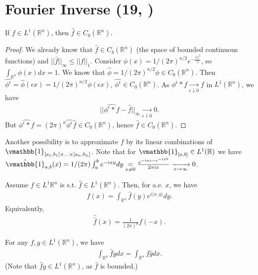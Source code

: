 \section{Fourier Inverse \tiny{(19, \cite{schilling2017measures})}}
\begin{corollary}
    If \(f\in L^1(\mathbb{R}^n)\), then \(\hat{f} \in C_0(\mathbb{R}^n)\).
\end{corollary}
\ifdetailed 
\begin{proof}
    We already know that \(\hat{f}\in C_b(\mathbb{R}^n)\) (the space of bounded continuous functions) and \(||\hat{f}||_{\infty} \leq ||f||_1\). Consider \( \phi(x)=1/(2\pi)^{n/2} e^{-\frac{|x|^2}{2}}\), so \(\int_{\mathbb{R}^n}\phi(x)dx = 1\). We know that \(\hat{\phi}= 1/(2\pi)^{n/2} \phi\in C_0(\mathbb{R}^n)\). Then \(\widehat{\phi^{\epsilon}} = \hat{\phi}(\epsilon x) = 1/(2\pi)^{n/2}\phi(\epsilon x)\), \(\hat{\phi^{\epsilon}} \in C_0(\mathbb{R}^n)\). As \(\phi^{\epsilon}\ast f\xrightarrow[\epsilon\downarrow 0]{ }f\) in \(L^1(\mathbb{R}^n)\), we have 
    \begin{align*}
        ||\widehat{\phi^{\epsilon}\ast f} - \hat{f}||_{\infty} \xrightarrow[\epsilon\downarrow 0]{ } 0.
    \end{align*}
    But \(\widehat{\phi^{\epsilon}\ast f} = (2\pi)^n \widehat{\phi^{\epsilon}}\hat{f}\in C_0(\mathbb{R}^n)\), hence \(\hat{f}\in C_0(\mathbb{R}^n)\).
\end{proof}
\fi 
\begin{remark}
    Another possibility is to approximate \(f\) by its linear combinations of \(\vmathbb{1}_{[a_1, b_1] \times ...\times [a_n, b_n]}\). Note that for \(\vmathbb{1}_{[a,b]}\in L^1(\mathbb{R})\) we have \(\hat{\vmathbb{1}}_{a,b}(x) = 1/(2\pi) \int_{a}^{b}e^{-ixy}dy \underset{x\neq 0}{=} \frac{e^{-iax - e^{-ixb}}}{2\pi ix}\xrightarrow[x\rightarrow \infty]{ }0\).
\end{remark}
\begin{theorem}
    Assume \(f\in L^1{\mathbb{R}^n}\) is s.t. \(\hat{f}\in L^1(\mathbb{R}^n)\). Then, for a.e. \(x\), we have
    \begin{align*}
        f(x) = \int_{\mathbb{R}^n}\hat{f}(y)e^{i\langle x,y\rangle} dy.
    \end{align*}
    Equivalently, 
    \begin{align*}
        \hat{\hat{f}}(x) = \frac{1}{(2\pi)^n}f(-x).
    \end{align*}
\end{theorem}
\begin{lemma}
    For any \(f,g\in L^1(\mathbb{R}^n)\), we have 
    \begin{align*}
        \int_{\mathbb{R}^n} \hat{f}gdx = \int_{\mathbb{R}^n}f\hat{g}dx. 
    \end{align*}
    (Note that \(\hat{f}g\in L^1(\mathbb{R}^n)\), as \(\hat{f}\) is bounded.)
\end{lemma}
